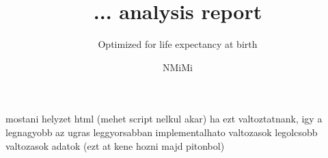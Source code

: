 \documentclass{charite}
\author{\textcolor{Letters}{NMiMi}
}
\title{\textcolor{Letters}{... analysis report}}
\subtitle{\textcolor{Letters}{Optimized for life expectancy at birth}}
\begin{document}
    
\newpage
mostani helyzet html (mehet script nelkul akar)
\newpage
ha ezt valtoztatnank, igy a legnagyobb az ugras
\newpage
leggyorsabban implementalhato valtozasok
\newpage
legolcsobb valtozasok
\newpage
adatok (ezt at kene hozni majd pitonbol)
\end{document}
